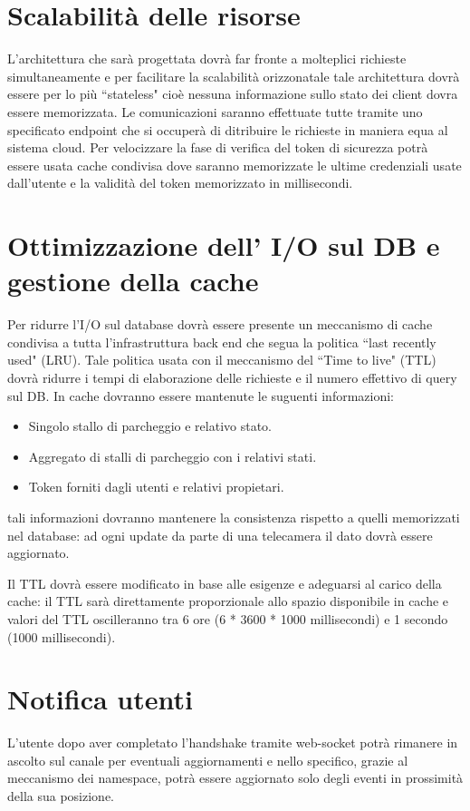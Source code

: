 \section{Scalabilità delle risorse}
L'architettura che sarà progettata dovrà far fronte a molteplici richieste simultaneamente e per facilitare la scalabilità orizzonatale tale architettura dovrà essere per lo più ``stateless" cioè nessuna informazione sullo stato dei client dovra essere memorizzata. Le comunicazioni saranno effettuate tutte tramite uno specificato endpoint che si occuperà di ditribuire le richieste in maniera equa al sistema cloud. Per velocizzare la fase di verifica del token di sicurezza potrà essere usata cache condivisa dove saranno memorizzate le ultime credenziali usate dall'utente e la validità del token memorizzato in millisecondi. 



\section{Ottimizzazione dell' I/O sul DB e gestione della cache}
Per ridurre l'I/O sul database dovrà essere presente un meccanismo di cache condivisa a tutta l'infrastruttura back end che segua la politica ``last recently used" (LRU). Tale politica usata con il meccanismo del ``Time to live" (TTL) dovrà ridurre i tempi di elaborazione delle richieste e il numero effettivo di query sul DB. In cache dovranno essere mantenute le suguenti informazioni:

\begin{itemize}
	\item Singolo stallo di parcheggio e relativo stato.
	\item Aggregato di stalli di parcheggio con i relativi stati.
	\item Token forniti dagli utenti e relativi propietari.
\end{itemize}

tali informazioni dovranno mantenere la consistenza rispetto a quelli memorizzati nel database: ad ogni update da parte di una telecamera il dato dovrà essere aggiornato. 

Il TTL dovrà essere modificato in base alle esigenze e adeguarsi al carico della cache: il TTL sarà direttamente proporzionale allo spazio disponibile in cache e valori del TTL oscilleranno tra 6 ore (6 * 3600 * 1000 millisecondi) e 1 secondo (1000 millisecondi).


\section{Notifica utenti} 
L'utente dopo aver completato l'handshake tramite web-socket potrà rimanere in ascolto sul canale per eventuali aggiornamenti e nello specifico, grazie al meccanismo dei namespace, potrà essere aggiornato solo degli eventi in prossimità della sua posizione. 
